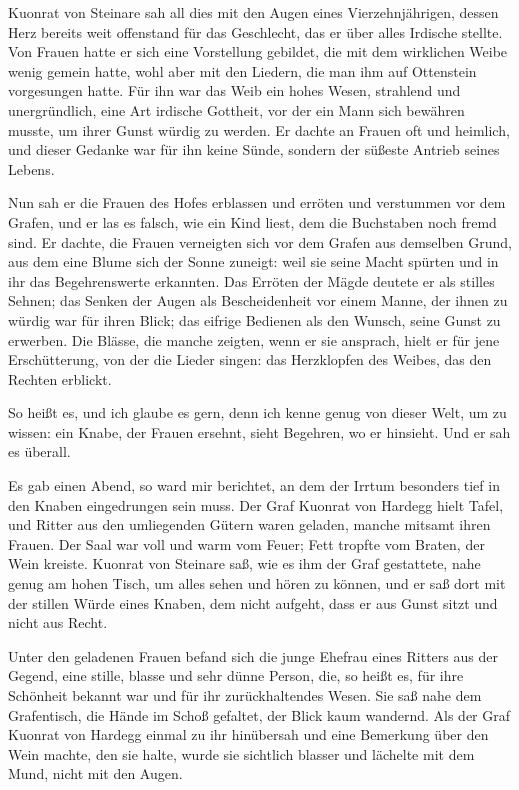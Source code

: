 \gls{Kuonrat von Steinare} sah all dies mit den Augen eines Vierzehnjährigen, dessen Herz bereits weit offenstand für das Geschlecht, das er über alles Irdische stellte. Von Frauen hatte er sich eine Vorstellung gebildet, die mit dem wirklichen Weibe wenig gemein hatte, wohl aber mit den Liedern, die man ihm auf Ottenstein vorgesungen hatte. Für ihn war das Weib ein hohes Wesen, strahlend und unergründlich, eine Art irdische Gottheit, vor der ein Mann sich bewähren musste, um ihrer Gunst würdig zu werden. Er dachte an Frauen oft und heimlich, und dieser Gedanke war für ihn keine Sünde, sondern der süßeste Antrieb seines Lebens.

Nun sah er die Frauen des Hofes erblassen und erröten und verstummen vor dem Grafen, und er las es falsch, wie ein Kind liest, dem die Buchstaben noch fremd sind. Er dachte, die Frauen verneigten sich vor dem Grafen aus demselben Grund, aus dem eine Blume sich der Sonne zuneigt: weil sie seine Macht spürten und in ihr das Begehrenswerte erkannten. Das Erröten der Mägde deutete er als stilles Sehnen; das Senken der Augen als Bescheidenheit vor einem Manne, der ihnen zu würdig war für ihren Blick; das eifrige Bedienen als den Wunsch, seine Gunst zu erwerben. Die Blässe, die manche zeigten, wenn er sie ansprach, hielt er für jene Erschütterung, von der die Lieder singen: das Herzklopfen des Weibes, das den Rechten erblickt.

So heißt es, und ich glaube es gern, denn ich kenne genug von dieser Welt, um zu wissen: ein Knabe, der Frauen ersehnt, sieht Begehren, wo er hinsieht. Und er sah es überall.

Es gab einen Abend, so ward mir berichtet, an dem der Irrtum besonders tief in den Knaben eingedrungen sein muss. Der Graf \gls{Kuonrat von Hardegg} hielt Tafel, und Ritter aus den umliegenden Gütern waren geladen, manche mitsamt ihren Frauen. Der Saal war voll und warm vom Feuer; Fett tropfte vom Braten, der Wein kreiste. \gls{Kuonrat von Steinare} saß, wie es ihm der Graf gestattete, nahe genug am hohen Tisch, um alles sehen und hören zu können, und er saß dort mit der stillen Würde eines Knaben, dem nicht aufgeht, dass er aus Gunst sitzt und nicht aus Recht.

Unter den geladenen Frauen befand sich die junge Ehefrau eines Ritters aus der Gegend, eine stille, blasse und sehr dünne Person, die, so heißt es, für ihre Schönheit bekannt war und für ihr zurückhaltendes Wesen. Sie saß nahe dem Grafentisch, die Hände im Schoß gefaltet, der Blick kaum wandernd. Als der Graf \gls{Kuonrat von Hardegg} einmal zu ihr hinübersah und eine Bemerkung über den Wein machte, den sie halte, wurde sie sichtlich blasser und lächelte mit dem Mund, nicht mit den Augen.

